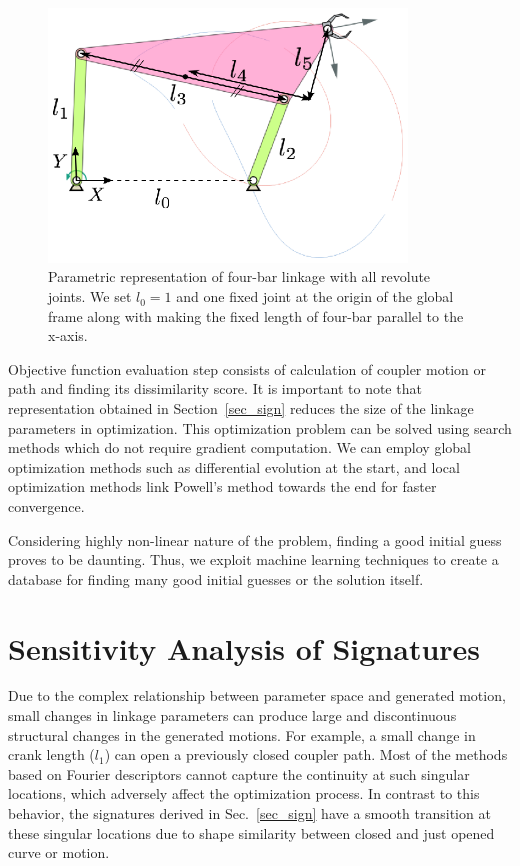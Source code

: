\documentclass[twocolumn,10pt]{asme2ej}
\begin{document}
\begin{figure}
\centering
\includegraphics[width=270pt]{figure/fig_fourbar.eps}
  \caption{Parametric representation of four-bar linkage with all revolute joints. We set $l_0 = 1$ and one fixed joint at the origin of the global frame along with making the fixed length of four-bar parallel to the x-axis.}
\label{fourbar}
\end{figure}

Objective function evaluation step consists of calculation of coupler motion or path and finding its dissimilarity score.
It is important to note that representation obtained in Section~\ref{sec_sign} reduces the size of the linkage parameters in optimization.
This optimization problem can be solved using search methods which do not require gradient computation.
We can employ global optimization methods such as differential evolution at the start, and local optimization methods link Powell's method towards the end for faster convergence\cite{ullah1997}.

Considering highly non-linear nature of the problem, finding a good initial guess proves to be daunting.
Thus, we exploit machine learning techniques to create a database for finding many good initial guesses or the solution itself.

\section{Sensitivity Analysis of Signatures}\label{sec_SA}
Due to the complex relationship between parameter space and generated motion, small changes in linkage parameters can produce large and discontinuous structural changes in the generated motions.
For example, a small change in crank length ($l_1$) can open a previously closed coupler path.
Most of the methods based on Fourier descriptors cannot capture the continuity at such singular locations, which adversely affect the optimization process.
In contrast to this behavior, the signatures derived in Sec.~\ref{sec_sign} have a smooth transition at these singular locations due to shape similarity between closed and just opened curve or motion.
\end{document}
